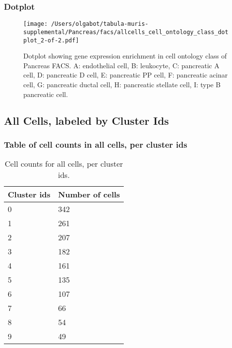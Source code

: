 \clearpage
\clearpage
\subsubsection{Dotplot}
\begin{figure}[h]
\centering
\texttt{[image: /Users/olgabot/tabula-muris-supplemental/Pancreas/facs/allcells\_cell\_ontology\_class\_dotplot\_2-of-2.pdf]}

\caption{ Dotplot  showing gene expression enrichment in cell ontology class of Pancreas FACS. A: endothelial cell, B: leukocyte, C: pancreatic A cell, D: pancreatic D cell, E: pancreatic PP cell, F: pancreatic acinar cell, G: pancreatic ductal cell, H: pancreatic stellate cell, I: type B pancreatic cell.}
\end{figure}


\clearpage
\subsection{All Cells, labeled by Cluster Ids}
\subsubsection{Table of cell counts in all cells, per cluster ids}\begin{table}[h]
\centering
\label{my-label}
\begin{tabular}{@{}ll@{}}
\toprule

Cluster ids& Number of cells \\ \midrule
0 & 342 \\

1 & 261 \\

2 & 207 \\

3 & 182 \\

4 & 161 \\

5 & 135 \\

6 & 107 \\

7 & 66 \\

8 & 54 \\

9 & 49 \\
\bottomrule
\end{tabular}
\caption{Cell counts for all cells, per cluster ids.}
\end{table}

